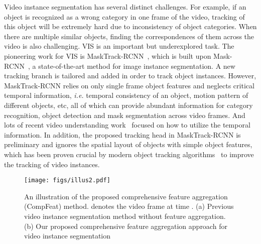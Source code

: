 \documentclass[letterpaper]{article} \usepackage{aaai21}  \usepackage{times}  \usepackage{helvet} \usepackage{courier}  \usepackage[hyphens]{url}  \usepackage{graphicx} \urlstyle{rm} \def\UrlFont{\rm}  \usepackage{natbib}  \usepackage{caption} \frenchspacing  \setlength{\pdfpagewidth}{8.5in}  \setlength{\pdfpageheight}{11in}  \newcommand{\etal}{\emph{et al. }}
\newcommand{\ie}{\emph{i.e. }}
\begin{document}
Video instance segmentation has several distinct challenges. For example, if an object is recognized as a wrong category in one frame of the video, tracking of this object will be extremely hard due to inconsistency of object categories. When there are multiple similar objects, finding the correspondences of them across the video is also challenging.
VIS is an important but underexplored task. The pioneering work for VIS is MaskTrack-RCNN~\cite{yang2019video}, which is built upon Mask-RCNN~\cite{he2017mask}, a state-of-the-art method for image instance segmentation. 
A new tracking branch is tailored and added in order to track object instances.
However, MaskTrack-RCNN relies on only single frame object features and neglects critical temporal information, \ie temporal consistency of an object, motion pattern of different objects, etc, all of which can provide abundant information for category recognition, object detection and mask segmentation across video frames. And lots of recent video understanding work~\cite{wang2018non, wu2019long} focused on how to utilize the temporal information.
In addition, the proposed tracking head in MaskTrack-RCNN is preliminary and ignores the spatial layout of objects with simple object features, 
which has been proven crucial by modern object tracking algorithms~\cite{zhang2019deeper,Zhu_2018_ECCV,li2019siamrpn++} to improve the tracking of video instances.


\begin{figure}[t]
	\centering
	\texttt{[image: figs/illus2.pdf]}
\caption{An illustration of the proposed comprehensive feature aggregation (CompFeat) method.  denotes the video frame at time . (a) Previous video instance segmentation method without feature aggregation. (b) Our proposed comprehensive feature aggregation approach for video instance segmentation}
	\label{fig:illus}
\end{figure}
\end{document}
